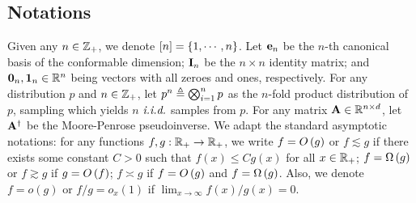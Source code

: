 \subsection{Notations}
Given any $n \in \mathbb{Z}_+$, we denote $[n] = \left\{1,\cdots,n\right\}$. 
Let $\mathbf{e}_n$ be the $n$-th canonical basis of the conformable dimension; $\mathbf{I}_n$ be the $n \times n$ identity matrix; and $\textbf0_n, \textbf1_n \in \mathbb{R}^n$ being vectors with all zeroes and ones, respectively. 
For any distribution $p$ and $n \in \mathbb{Z}_+$, let $p^n \triangleq \bigotimes_{i=1}^n p$ as the $n$-fold product distribution of $p$, sampling which yields $n$ $\emph{i.i.d.}$ samples from $p$.
For any matrix $\mathbf{A} \in \mathbb{R}^{n \times d}$, let $\mathbf{A}^\dagger$ be the Moore-Penrose pseudoinverse.
We adapt the standard asymptotic notations: for any functions $f,g: \mathbb{R}_+ \to \mathbb{R}_+$, we write $f = O\left(g\right)$ or $f \lesssim g$ if there exists some constant $C>0$ such that $f(x) \leq C g(x)$ for all $x \in \mathbb{R}_+$; $f = \Omega\left(g\right)$ or $f \gtrsim g$ if $g = O\left(f\right)$; $f \asymp g$ if $f = O\left(g\right)$ and $f = \Omega\left(g\right)$. Also, we denote $f = o(g)$ or $f/g = o_x(1)$ if $\lim_{x \to \infty} f(x)/g(x) = 0$.
